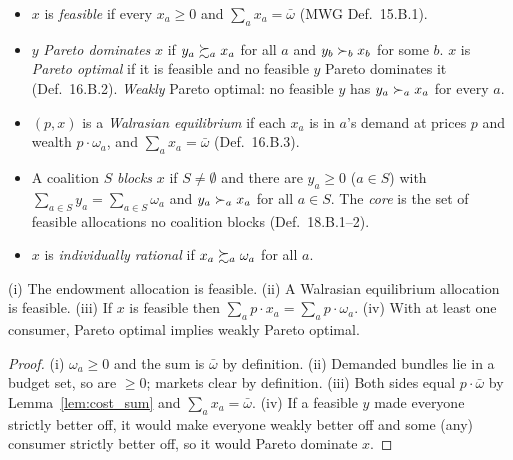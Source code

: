 \begin{definition}
\label{def:ge_notions}
\leanok
{}
\begin{itemize}
\item $x$ is \emph{feasible} if every $x_a \ge 0$ and $\sum_a x_a = \bar\omega$ (MWG Def.~15.B.1).
\item $y$ \emph{Pareto dominates} $x$ if $y_a \succsim_a x_a$ for all $a$ and $y_b \succ_b x_b$ for some $b$. $x$ is
\emph{Pareto optimal} if it is feasible and no feasible $y$ Pareto dominates it (Def.~16.B.2). \emph{Weakly} Pareto
optimal: no feasible $y$ has $y_a \succ_a x_a$ for every $a$.
\item $(p, x)$ is a \emph{Walrasian equilibrium} if each $x_a$ is in $a$'s demand at prices $p$ and wealth
$p \cdot \omega_a$, and $\sum_a x_a = \bar\omega$ (Def.~16.B.3).
\item A coalition $S$ \emph{blocks} $x$ if $S \neq \emptyset$ and there are $y_a \ge 0$ ($a \in S$) with
$\sum_{a \in S} y_a = \sum_{a \in S} \omega_a$ and $y_a \succ_a x_a$ for all $a \in S$. The \emph{core} is the set of
feasible allocations no coalition blocks (Def.~18.B.1--2).
\item $x$ is \emph{individually rational} if $x_a \succsim_a \omega_a$ for all $a$.
\end{itemize}
\end{definition}

\begin{lemma}
\label{lem:ge_basic}
\leanok
{}
(i) The endowment allocation is feasible. (ii) A Walrasian equilibrium allocation is feasible. (iii) If $x$ is
feasible then $\sum_a p \cdot x_a = \sum_a p \cdot \omega_a$. (iv) With at least one consumer, Pareto optimal implies
weakly Pareto optimal.
\end{lemma}
\begin{proof}
\leanok
(i) $\omega_a \ge 0$ and the sum is $\bar\omega$ by definition. (ii) Demanded bundles lie in a budget set, so are
$\ge 0$; markets clear by definition. (iii) Both sides equal $p \cdot \bar\omega$ by Lemma~\ref{lem:cost_sum} and
$\sum_a x_a = \bar\omega$. (iv) If a feasible $y$ made everyone strictly better off, it would make everyone weakly
better off and some (any) consumer strictly better off, so it would Pareto dominate $x$.
\end{proof}

